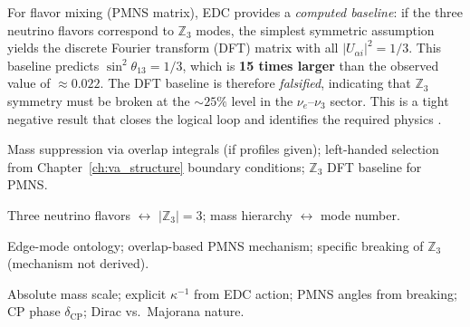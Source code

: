 For flavor mixing (PMNS matrix), EDC provides a \emph{computed baseline}: if the
three neutrino flavors correspond to $\mathbb{Z}_3$ modes, the simplest symmetric
assumption yields the discrete Fourier transform (DFT) matrix with all
$|U_{\alpha i}|^2 = 1/3$. This baseline predicts $\sin^2\theta_{13} = 1/3$,
which is \textbf{15 times larger} than the observed value of $\approx 0.022$.
The DFT baseline is therefore \emph{falsified}, indicating that $\mathbb{Z}_3$
symmetry must be broken at the $\sim 25\%$ level in the $\nu_e$--$\nu_3$ sector.
This is a tight negative result that closes the logical loop and identifies the
required physics \tagDc{}.


\begin{tcolorbox}[colback=blue!5, colframe=blue!50!black,
    title=\textbf{Reader Map: What This Chapter Establishes}]
\begin{description}[style=nextline, leftmargin=1em, font=\normalfont\bfseries]
    \item[Derived \tagDc{}:]
        Mass suppression via overlap integrals (if profiles given);
        left-handed selection from Chapter~\ref{ch:va_structure} boundary conditions;
        $\mathbb{Z}_3$ DFT baseline for PMNS.

    \item[Identified \tagI{}:]
        Three neutrino flavors $\leftrightarrow$ $|\mathbb{Z}_3| = 3$;
        mass hierarchy $\leftrightarrow$ mode number.

    \item[Postulated \tagP{}:]
        Edge-mode ontology;
        overlap-based PMNS mechanism;
        specific breaking of $\mathbb{Z}_3$ (mechanism not derived).

    \item[Open (not addressed):]
        Absolute mass scale;
        explicit $\kappa^{-1}$ from EDC action;
        PMNS angles from breaking;
        CP phase $\delta_{\text{CP}}$;
        Dirac vs.\ Majorana nature.
\end{description}
\end{tcolorbox}


